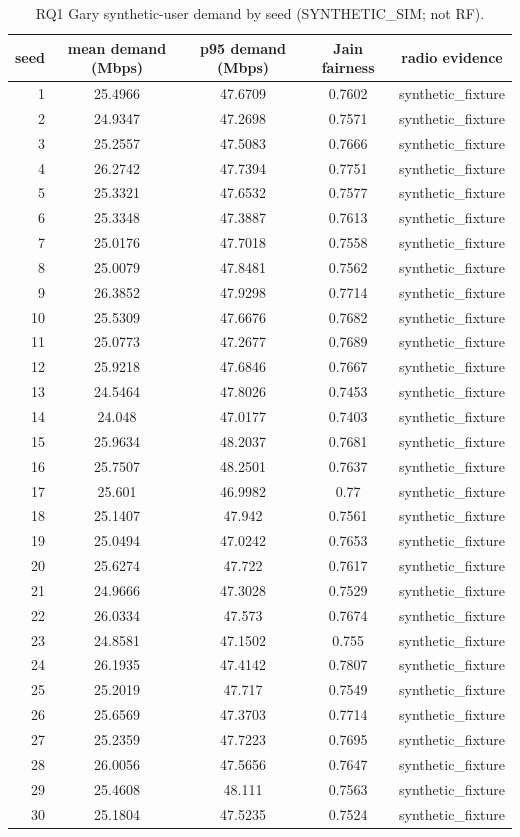 \begin{table}[h]
\centering
\caption{RQ1 Gary synthetic-user demand by seed (SYNTHETIC\_SIM; not RF).}
\begin{tabular}{rcccc}\toprule
seed & mean demand (Mbps) & p95 demand (Mbps) & Jain fairness & radio evidence \\\midrule
1 & 25.4966 & 47.6709 & 0.7602 & synthetic\_fixture \\
2 & 24.9347 & 47.2698 & 0.7571 & synthetic\_fixture \\
3 & 25.2557 & 47.5083 & 0.7666 & synthetic\_fixture \\
4 & 26.2742 & 47.7394 & 0.7751 & synthetic\_fixture \\
5 & 25.3321 & 47.6532 & 0.7577 & synthetic\_fixture \\
6 & 25.3348 & 47.3887 & 0.7613 & synthetic\_fixture \\
7 & 25.0176 & 47.7018 & 0.7558 & synthetic\_fixture \\
8 & 25.0079 & 47.8481 & 0.7562 & synthetic\_fixture \\
9 & 26.3852 & 47.9298 & 0.7714 & synthetic\_fixture \\
10 & 25.5309 & 47.6676 & 0.7682 & synthetic\_fixture \\
11 & 25.0773 & 47.2677 & 0.7689 & synthetic\_fixture \\
12 & 25.9218 & 47.6846 & 0.7667 & synthetic\_fixture \\
13 & 24.5464 & 47.8026 & 0.7453 & synthetic\_fixture \\
14 & 24.048 & 47.0177 & 0.7403 & synthetic\_fixture \\
15 & 25.9634 & 48.2037 & 0.7681 & synthetic\_fixture \\
16 & 25.7507 & 48.2501 & 0.7637 & synthetic\_fixture \\
17 & 25.601 & 46.9982 & 0.77 & synthetic\_fixture \\
18 & 25.1407 & 47.942 & 0.7561 & synthetic\_fixture \\
19 & 25.0494 & 47.0242 & 0.7653 & synthetic\_fixture \\
20 & 25.6274 & 47.722 & 0.7617 & synthetic\_fixture \\
21 & 24.9666 & 47.3028 & 0.7529 & synthetic\_fixture \\
22 & 26.0334 & 47.573 & 0.7674 & synthetic\_fixture \\
23 & 24.8581 & 47.1502 & 0.755 & synthetic\_fixture \\
24 & 26.1935 & 47.4142 & 0.7807 & synthetic\_fixture \\
25 & 25.2019 & 47.717 & 0.7549 & synthetic\_fixture \\
26 & 25.6569 & 47.3703 & 0.7714 & synthetic\_fixture \\
27 & 25.2359 & 47.7223 & 0.7695 & synthetic\_fixture \\
28 & 26.0056 & 47.5656 & 0.7647 & synthetic\_fixture \\
29 & 25.4608 & 48.111 & 0.7563 & synthetic\_fixture \\
30 & 25.1804 & 47.5235 & 0.7524 & synthetic\_fixture \\
\bottomrule\end{tabular}
\end{table}
